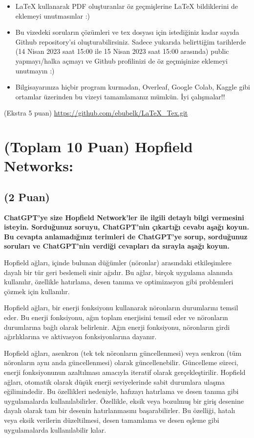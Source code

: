 \documentclass[11pt]{article}
\begin{document}
\begin{itemize}
    \item LaTeX kullanarak PDF oluşturanlar öz geçmişlerine LaTeX bildiklerini de eklemeyi unutmasınlar :)
    \item Bu vizedeki soruların çözümleri ve tex dosyası için istediğiniz kadar sayıda Github repository'si oluşturabilirsiniz. Sadece yukarıda belirttiğim tarihlerde (14 Nisan 2023 saat 15:00 ile 15 Nisan 2023 saat 15:00 arasında) public yapmayı/halka açmayı ve Github profilinizi de öz geçmişinize eklemeyi unutmayın :)
    \item Bilgisayarınıza hiçbir program kurmadan, Overleaf, Google Colab, Kaggle gibi ortamlar üzerinden bu vizeyi tamamlamanız mümkün. İyi çalışmalar!!
\end{itemize}

(Ekstra 5 puan) \url{https://github.com/ebubelk/LaTeX_Tex.git}

\newpage
\section{(Toplam 10 Puan) Hopfield Networks:}

\subsection{(2 Puan)} \textbf{ChatGPT’ye size Hopfield Network’ler ile ilgili detaylı bilgi vermesini isteyin. Sorduğunuz soruyu, ChatGPT'nin çıkartığı cevabı aşağı koyun. Bu cevapta anlamadığınız terimleri de ChatGPT’ye sorup, sorduğunuz soruları ve ChatGPT’nin verdiği cevapları da sırayla aşağı koyun.}

    Hopfield ağları, içinde bulunan düğümler (nöronlar) arasındaki etkileşimlere dayalı bir tür geri beslemeli sinir ağıdır. Bu ağlar, birçok uygulama alanında kullanılır, özellikle hatırlama, desen tanıma ve optimizasyon gibi problemleri çözmek için kullanılır.
    
    Hopfield ağları, bir enerji fonksiyonu kullanarak nöronların durumlarını temsil eder. Bu enerji fonksiyonu, ağın toplam enerjisini temsil eder ve nöronların durumlarına bağlı olarak belirlenir. Ağın enerji fonksiyonu, nöronların girdi ağırlıklarına ve aktivasyon fonksiyonlarına dayanır.
    
    Hopfield ağları, asenkron (tek tek nöronların güncellenmesi) veya senkron (tüm nöronların aynı anda güncellenmesi) olarak güncellenebilir. Güncelleme süreci, enerji fonksiyonunun azaltılması amacıyla iteratif olarak gerçekleştirilir.
    Hopfield ağları, otomatik olarak düşük enerji seviyelerinde sabit durumlara ulaşma eğilimindedir. Bu özellikleri nedeniyle, hafızayı hatırlama ve desen tanıma gibi uygulamalarda kullanılabilirler. Özellikle, eksik veya bozulmuş bir giriş desenine dayalı olarak tam bir desenin hatırlanmasını başarabilirler. Bu özelliği, hatalı veya eksik verilerin düzeltilmesi, desen tamamlama ve desen eşleme gibi uygulamalarda kullanılabilir kılar.
    
\end{document}

